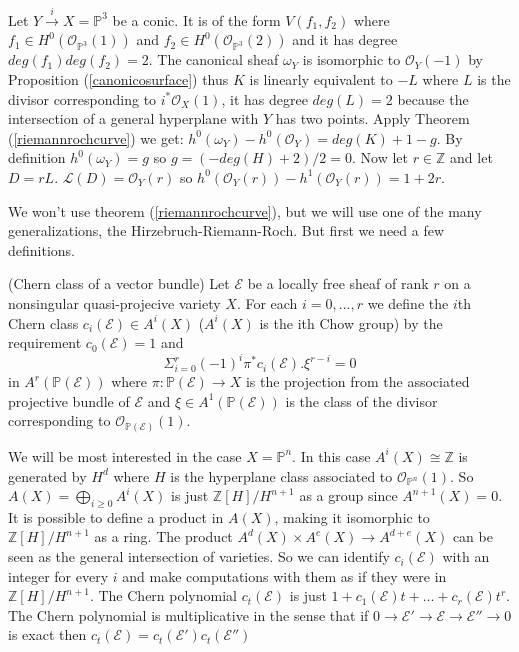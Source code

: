 \documentclass[
	oldfontcommands,
	sumario=abnt-6027-2012,
	12pt,			%
	openright,		%
	oneside,		%
	a4paper,		%
	english,		%
	brazil			%
	]{imecc-unicamp}
\begin{document}
\begin{example}
	Let $Y \overset{i}{\to} X=\mathbb{P}^3$ be a conic. It is of the form $V(f_1,f_2)$ where $f_1 \in H^0(\mathcal{O}_{\mathbb{P}^3}(1))$ and $f_2 \in H^0(\mathcal{O}_{\mathbb{P}^3}(2))$ and it has degree $deg(f_1)deg(f_2)=2$. The canonical sheaf $\omega_Y$ is isomorphic to $\mathcal{O}_Y(-1)$ by Proposition (\ref{canonicosurface}) thus $K$ is linearly equivalent to $-L$ where $L$ is the divisor corresponding to $i^*\mathcal{O}_X(1)$, it has degree $deg(L)=2$ because the intersection of a general hyperplane with $Y$ has two points. Apply Theorem (\ref{riemannrochcurve}) we get: $h^0(\omega_Y)-h^0(\mathcal{O}_Y)=deg(K)+1-g$. By definition $h^0(\omega_Y)=g$ so $g=(-deg(H)+2)/2=0$. Now let $r \in \mathbb{Z}$ and let $D=rL$. $\mathcal{L}(D)=\mathcal{O}_Y(r)$ so $h^0(\mathcal{O}_Y(r))-h^1(\mathcal{O}_Y(r))=1+2r$.
\end{example}
We won't use theorem (\ref{riemannrochcurve}), but we will use one of the many generalizations, the Hirzebruch-Riemann-Roch. But first we need a few definitions.
\begin{definition}(Chern class of a vector bundle)\cite[Hartshorne, p.429]{hartshorne_2010}\label{defchern}
Let $\mathcal{E}$ be a locally free sheaf of rank $r$ on a nonsingular quasi-projecive variety $X$. For each $i=0,...,r$ we define the $i$th Chern class $c_i(\mathcal{E})\in A^i(X)$ ($A^i(X)$ is the ith Chow group) by the requirement $c_0(\mathcal{E})=1$ and
\begin{equation}
\Sigma_{i=0}^r (-1)^i \pi^* c_i(\mathcal{E}).\xi^{r-i}=0
\end{equation}
in $ A^r(\mathbb{P}(\mathcal{E}))$ where $\pi : \mathbb{P}(\mathcal{E}) \to X$ is the projection from the associated projective bundle of $\mathcal{E}$ and $\xi \in A^1(\mathbb{P}(\mathcal{E}))$ is the class of the divisor corresponding to $\mathcal{O}_{\mathbb{P}(\mathcal{E})}(1)$.
\end{definition}
We will be most interested in the case $X=\mathbb{P}^n$. In this case $A^i(X)\cong\mathbb{Z}$ is generated by $H^d$ where $H$ is the hyperplane class associated to $\mathcal{O}_{\mathbb{P}^n}(1)$. So $A(X)=\bigoplus_{i \geq 0}A^i(X)$ is just $\mathbb{Z}[H]/H^{n+1}$ as a group since $A^{n+1}(X)=0$. It is possible to define a product in $A(X)$, making it isomorphic to $\mathbb{Z}[H]/H^{n+1}$ as a ring. The product $A^d(X) \times A^e(X) \to A^{d+e}(X)$ can be seen as the general intersection of varieties. So we can identify $c_i(\mathcal{E})$ with an integer for every $i$ and make computations with them as if they were in $\mathbb{Z}[H]/H^{n+1}$. The Chern polynomial $c_t(\mathcal{E})$ is just $1+c_1(\mathcal{E})t+...+c_r(\mathcal{E})t^r$. The Chern polynomial is multiplicative in the sense that if $0 \to \mathcal{E}' \to \mathcal{E} \to \mathcal{E}'' \to 0$ is exact then $c_t(\mathcal{E})=c_t(\mathcal{E}')c_t(\mathcal{E}'')$
\end{document}
